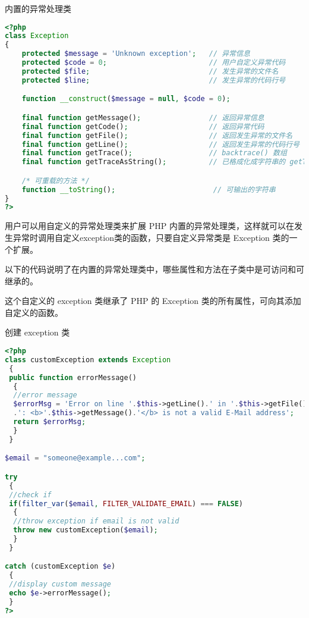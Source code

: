 \begin{example}
内置的异常处理类
\begin{lstlisting}[language=PHP]
<?php
class Exception
{
    protected $message = 'Unknown exception';   // 异常信息
    protected $code = 0;                        // 用户自定义异常代码
    protected $file;                            // 发生异常的文件名
    protected $line;                            // 发生异常的代码行号

    function __construct($message = null, $code = 0);

    final function getMessage();                // 返回异常信息
    final function getCode();                   // 返回异常代码
    final function getFile();                   // 返回发生异常的文件名
    final function getLine();                   // 返回发生异常的代码行号
    final function getTrace();                  // backtrace() 数组
    final function getTraceAsString();          // 已格成化成字符串的 getTrace() 信息

    /* 可重载的方法 */
    function __toString();                       // 可输出的字符串
}
?>
\end{lstlisting}
\end{example}


用户可以用自定义的异常处理类来扩展 PHP 内置的异常处理类，这样就可以在发生异常时调用自定义exception类的函数，只要自定义异常类是 Exception 类的一个扩展。

以下的代码说明了在内置的异常处理类中，哪些属性和方法在子类中是可访问和可继承的。


这个自定义的 exception 类继承了 PHP 的 Exception 类的所有属性，可向其添加自定义的函数。


\begin{example}
创建 exception 类
\begin{lstlisting}[language=PHP]
<?php
class customException extends Exception
 {
 public function errorMessage()
  {
  //error message
  $errorMsg = 'Error on line '.$this->getLine().' in '.$this->getFile()
  .': <b>'.$this->getMessage().'</b> is not a valid E-Mail address';
  return $errorMsg;
  }
 }

$email = "someone@example...com";

try
 {
 //check if 
 if(filter_var($email, FILTER_VALIDATE_EMAIL) === FALSE)
  {
  //throw exception if email is not valid
  throw new customException($email);
  }
 }

catch (customException $e)
 {
 //display custom message
 echo $e->errorMessage();
 }
?>
\end{lstlisting}
\end{example}

